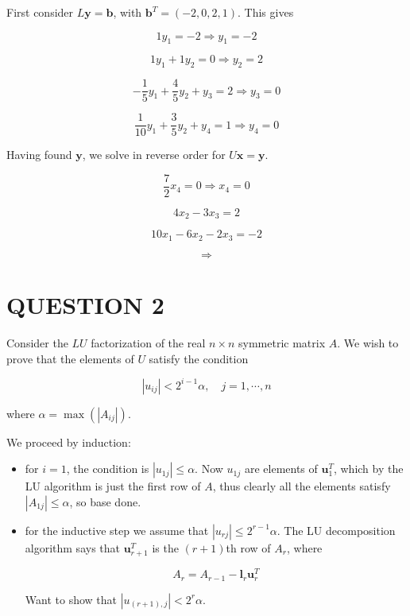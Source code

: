 \documentclass[a4paper]{article}
\begin{document}
First consider $  L \mathbf{y} = \mathbf{b} $, with $ \mathbf{b}^{T} = (-2,0,2,1) $. This gives

\[ 1 y_{1} = -2  \Rightarrow y_{1} = -2 \]

\[ 1 y_{1} + 1 y_{2} = 0 \Rightarrow y_{2} = 2 \]

\[ - \frac{1}{5} y_{1} + \frac{4}{5} y_{2} + y_{3} = 2 \Rightarrow y_{3} =  0 \]

\[ \frac{1}{10} y_{1} + \frac{3}{5} y_{2} + y_{4} = 1 \Rightarrow y_{4} =  0 \]

Having found $ \mathbf{y} $, we solve in reverse order for $ U\mathbf{x} = \mathbf{y} $. 

\[ \frac{7}{2} x_{4} = 0 \Rightarrow x_{4} = 0 \]

\[ 4 x_{2} - 3 x_{3} = 2  \]

\[ 10 x_{1} - 6 x_{2} - 2 x_{3} = -2  \]

\[ \Rightarrow  \]









\section{QUESTION 2}

Consider the $ LU $ factorization of the real $ n \times n $ symmetric matrix $ A $. We wish to prove that the elements of $ U $ satisfy the condition 

\[ | u_{ij} | < 2^{i-1} \alpha, \quad j = 1,\cdots,n \]

where $ \alpha = \max( | A_{ij} |  ) $. 

We proceed by induction:

\begin{itemize}
	\item for $ i = 1 $, the condition is $ | u_{1j} | \leq \alpha  $. Now $ u_{1j} $ are elements of $ \mathbf{u}_{1}^{T} $, which by the LU algorithm is just the first row of $ A $, thus clearly all the elements satisfy $ | A_{1j} | \leq \alpha $, so base done. 
	
	
	\item for the inductive step we assume that $ | u_{rj} | \leq 2^{r-1} \alpha  $. The LU decomposition algorithm says that $ \mathbf{u}_{r+1}^{T} $ is the $ (r+1) $th row of $ A_{r} $, where 
	
	\[ A_{r} = A_{r-1} - \mathbf{l}_{r}\mathbf{u}_{r}^{T} \] 
	
	Want to show that $ \left| u_{(r+1),j} \right| < 2^{r} \alpha $. 
	
	
	
	
\end{itemize} 
\end{document}
